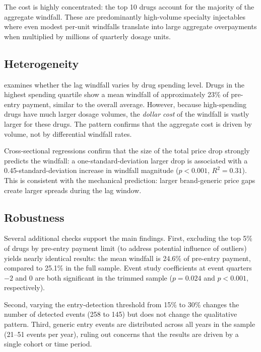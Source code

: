 \documentclass[12pt]{article}
\begin{document}
The cost is highly concentrated: the top 10 drugs account for the majority of the aggregate windfall. These are predominantly high-volume specialty injectables where even modest per-unit windfalls translate into large aggregate overpayments when multiplied by millions of quarterly dosage units.



\subsection{Heterogeneity}

 examines whether the lag windfall varies by drug spending level. Drugs in the highest spending quartile show a mean windfall of approximately 23\% of pre-entry payment, similar to the overall average. However, because high-spending drugs have much larger dosage volumes, the \textit{dollar cost} of the windfall is vastly larger for these drugs. The pattern confirms that the aggregate cost is driven by volume, not by differential windfall rates.

Cross-sectional regressions confirm that the size of the total price drop strongly predicts the windfall: a one-standard-deviation larger drop is associated with a 0.45-standard-deviation increase in windfall magnitude ($p < 0.001$, $R^2 = 0.31$). This is consistent with the mechanical prediction: larger brand-generic price gaps create larger spreads during the lag window.



\subsection{Robustness}

Several additional checks support the main findings. First, excluding the top 5\% of drugs by pre-entry payment limit (to address potential influence of outliers) yields nearly identical results: the mean windfall is 24.6\% of pre-entry payment, compared to 25.1\% in the full sample. Event study coefficients at event quarters $-2$ and 0 are both significant in the trimmed sample ($p = 0.024$ and $p < 0.001$, respectively).

Second, varying the entry-detection threshold from 15\% to 30\% changes the number of detected events (258 to 145) but does not change the qualitative pattern. Third, generic entry events are distributed across all years in the sample (21--51 events per year), ruling out concerns that the results are driven by a single cohort or time period.
\end{document}
